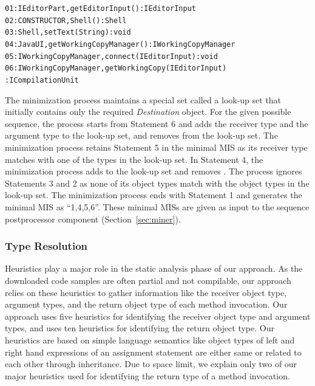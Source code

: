 \begin{CodeOut}
\begin{alltt}
01:IEditorPart,getEditorInput() : IEditorInput
02:CONSTRUCTOR,Shell() : Shell
03:Shell,setText(String) : void
04:JavaUI,getWorkingCopyManager() : IWorkingCopyManager
05:IWorkingCopyManager,connect(IEditorInput) : void
06:IWorkingCopyManager,getWorkingCopy(IEditorInput)
\hspace*{0.5in}: ICompilationUnit
\end{alltt}
\end{CodeOut}

The minimization process maintains a special set called a look-up set
that initially contains only the required \emph{Destination} object.
For the given possible sequence, the process starts from Statement 6
and adds the receiver type  and the
argument type  to the look-up set, and removes
 from the look-up set. The minimization
process retains Statement 5 in the minimal MIS as its receiver type
matches with one of the types in the look-up set. In Statement 4,
the minimization process adds  to the look-up set and
removes . The process ignores Statements
3 and 2 as none of its object types match with the object types in
the look-up set. The minimization process ends with Statement 1 and
generates the minimal MIS as ``1,4,5,6''. These minimal MISs are
given as input to the sequence postprocessor component
(Section~\ref{sec:miner}).
\subsubsection{Type Resolution}
\label{sec:heuristics}

Heuristics play a major role in the static analysis phase of our
approach. As the downloaded code samples are often partial and not
compilable, our approach relies on these heuristics to gather
information like the receiver object type, argument types, and the
return object type of each method invocation. Our approach uses five
heuristics for identifying the receiver object type and argument
types, and uses ten heuristics for identifying the return object
type. Our heuristics are based on simple language semantics like
object types of left and right hand expressions of an assignment
statement are either same or related to each other through
inheritance. Due to space limit, we explain only two of our
major heuristics used for identifying the return type of a method
invocation.


